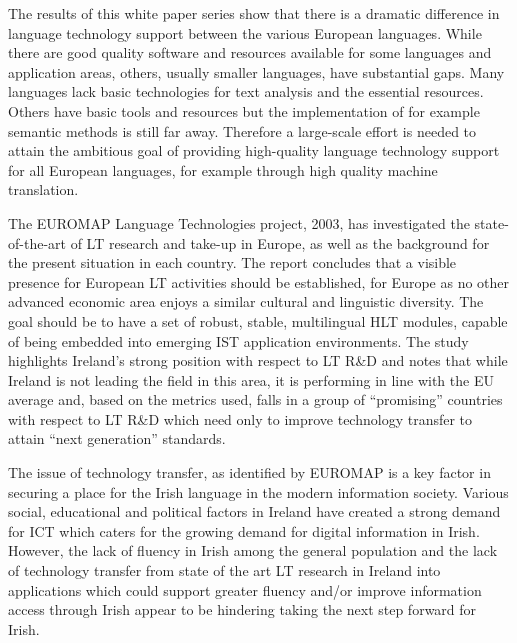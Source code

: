 \documentclass[]{../../metanetpaper}
\begin{document}
\begin{multicols}{2}
The results of this white paper series show that there is a dramatic difference in language technology support between the various European languages. While there are good quality software and resources available for some languages and application areas, others, usually smaller languages, have substantial gaps. Many languages lack basic technologies for text analysis and the essential resources. Others have basic tools and resources but the implementation of for example semantic methods is still far away. Therefore a large-scale effort is needed to attain the ambitious goal of providing high-quality language technology support for all European languages, for example through high quality machine translation. 

The EUROMAP Language Technologies \cite{euromap} project, 2003, has investigated the state-of-the-art of LT research and take-up in Europe, as well as the background for the present situation in each country. The report concludes that a visible presence for European LT activities should be established, for Europe as no other advanced economic area enjoys a similar cultural and linguistic diversity. The goal should be to have a set of robust, stable, multilingual HLT modules, capable of being embedded into emerging IST application environments. The study highlights Ireland’s strong position with respect to LT R\&D and notes that while Ireland is not leading the field in this area, it is performing in line with the EU average and, based on the metrics used, falls in a group of ``promising'' countries with respect to LT R\&D which need only to improve technology transfer to attain ``next generation'' standards.


The issue of technology transfer, as identified by EUROMAP is a key factor in securing a place for the Irish language in the modern information society. Various social, educational and political factors in Ireland have created a strong demand for ICT which caters for the growing demand for digital information in Irish. However, the lack of fluency in Irish among the general population and the lack of technology transfer from state of the art LT research in Ireland into applications which could support greater fluency and/or improve information access through Irish appear to be hindering taking the next step forward for Irish.


\end{multicols}
\end{document}
